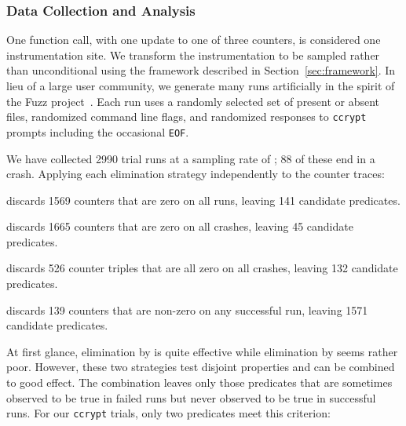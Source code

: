 \subsubsection{Data Collection and Analysis}

One function call, with one update to one of three counters, is considered one
instrumentation site.  We transform the instrumentation to be sampled
rather than unconditional using the framework described in
Section~\ref{sec:framework}.  In lieu of a large user community, we
generate many runs artificially in the spirit of the Fuzz
project~\cite{MKLMMNS95}.  Each run uses a randomly selected set of
present or absent files, randomized command line flags, and randomized
responses to \texttt{ccrypt} prompts including the occasional
\texttt{EOF}.

We have collected 2990 trial runs at a sampling rate of
; 88 of these end in a crash.  Applying each
elimination strategy independently to the counter traces:

\begin{elimlist}
\item[\elim{Universal falsehood}] discards 1569 counters that are
  zero on all runs, leaving 141 candidate predicates.
  
\item[\elim{Lack of failing example}] discards 1665 counters that are
  zero on all crashes, leaving 45 candidate predicates.
  
\item[\elim{Lack of failing coverage}] discards 526 counter triples
  that are all zero on all crashes, leaving 132 candidate predicates.
  
\item[\elim{Successful counterexample}] discards 139 counters that
  are non-zero on any successful run, leaving 1571 candidate
  predicates.
\end{elimlist}

\begin{sloppypar}
  At first glance, elimination by  is quite
  effective while elimination by 
  seems rather poor.  However, these two strategies test disjoint
  properties and can be combined to good effect.  The combination
  leaves only those predicates that are sometimes observed to be true
  in failed runs but never observed to be true in successful runs.
  For our \texttt{ccrypt} trials, only two predicates meet this
  criterion:
\end{sloppypar}

